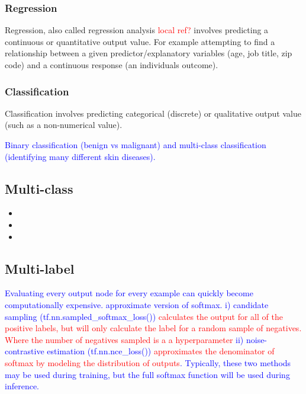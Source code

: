 \subsubsection{Regression} 

Regression, also called regression analysis \textcolor{red}{local ref?} involves predicting a continuous or quantitative output value. For example attempting to find a relationship between a given predictor/explanatory variables (age, job title, zip code) and a continuous response (an individuals outcome).

\subsubsection{Classification} 

Classification involves predicting categorical (discrete) or qualitative output value (such as a non-numerical value). 

\textcolor{blue}{Binary classification (benign vs malignant) and multi-class classification (identifying many different skin diseases).}

\subsection{Multi-class}

\begin{itemize}[noitemsep,topsep=0pt]
	\item {}
	\item {}
	\item {}
\end{itemize}


\subsection{Multi-label}


\textcolor{blue}{Evaluating every output node for every example can quickly become computationally expensive. approximate version of softmax. i) candidate sampling (tf.nn.sampled\_softmax\_loss()) \textcolor{red}{calculates the output for all of the positive labels, but will only calculate the label for a random sample of negatives. Where the number of negatives sampled is a a hyperparameter} ii) noise-contrastive estimation (tf.nn.nce\_loss()) \textcolor{red}{approximates the denominator of softmax by modeling the distribution of outputs}. Typically, these two methods may be used during training, but the full softmax function will be used during inference.}


